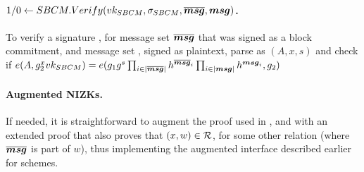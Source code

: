 

\paragraph{$1/0 \gets SBCM.Verify(vk_{SBCM},\sigma_{SBCM},\overline{\boldsymbol{msg}},\boldsymbol{msg})$.} %
To verify a signature \SBCMsig, for message set $\overline{\boldsymbol{msg}}$ that was
signed as a block commitment, and message set \smsg, signed as plaintext, parse
\SBCMsig as $(A,x,s)$ and check if $e(A,g_2^xvk_{SBCM}) =
e(g_1g^s\prod_{i \in |\overline{\boldsymbol{msg}}|}h^{\overline{\boldsymbol{msg}}_i}
\prod_{i \in |\boldsymbol{msg}|}h^{\boldsymbol{msg}_i},g_2)$

\paragraph{Augmented NIZKs.} %
If needed, it is straightforward to augment the proof \NIZKproof used
in \SBCMBlind, \SBCMSign and \SBCMUnblind  with an extended proof that also
proves that $(x,w) \in \mathcal{R}$, for some other relation \NIZKRel (where
$\overline{\boldsymbol{msg}}$ is part of $w$), thus implementing the augmented interface described
earlier for \SBCM schemes.

